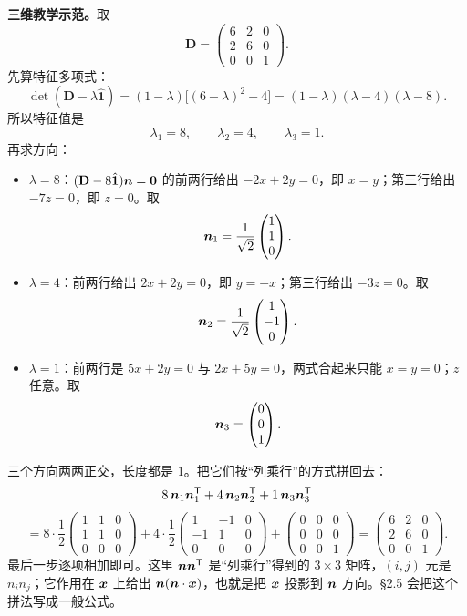 \documentclass[11pt]{ctexart}
\newcommand{\ten}[1]{\mathbf{#1}}
\newcommand{\unitd}{\hat{\ten{1}}}
\begin{document}
\textbf{三维教学示范。}取
\[
\ten D=\begin{pmatrix}6&2&0\\2&6&0\\0&0&1\end{pmatrix}.
\]
先算特征多项式：
\[
\det(\ten D-\lambda\unitd)
=(1-\lambda)\bigl[(6-\lambda)^2-4\bigr]
=(1-\lambda)(\lambda-4)(\lambda-8).
\]
所以特征值是
\[
\lambda_1=8,\qquad \lambda_2=4,\qquad \lambda_3=1.
\]
再求方向：
\begin{itemize}[leftmargin=1.8em,itemsep=2pt]
\item $\lambda=8$：$(\ten D-8\unitd)\vect n=\vect0$ 的前两行给出 $-2x+2y=0$，即 $x=y$；第三行给出 $-7z=0$，即 $z=0$。取
\[
\boldsymbol{n}_1=\frac{1}{\sqrt2}\begin{pmatrix}1\\1\\0\end{pmatrix}.
\]
\item $\lambda=4$：前两行给出 $2x+2y=0$，即 $y=-x$；第三行给出 $-3z=0$。取
\[
\boldsymbol{n}_2=\frac{1}{\sqrt2}\begin{pmatrix}1\\-1\\0\end{pmatrix}.
\]
\item $\lambda=1$：前两行是 $5x+2y=0$ 与 $2x+5y=0$，两式合起来只能 $x=y=0$；$z$ 任意。取
\[
\boldsymbol{n}_3=\begin{pmatrix}0\\0\\1\end{pmatrix}.
\]
\end{itemize}
三个方向两两正交，长度都是 $1$。把它们按“列乘行”的方式拼回去：
\[
8\,\boldsymbol{n}_1\boldsymbol{n}_1^{\mathsf T}
+4\,\boldsymbol{n}_2\boldsymbol{n}_2^{\mathsf T}
+1\,\boldsymbol{n}_3\boldsymbol{n}_3^{\mathsf T}
\]
\[
=8\cdot\frac12\begin{pmatrix}1&1&0\\1&1&0\\0&0&0\end{pmatrix}
+4\cdot\frac12\begin{pmatrix}1&-1&0\\-1&1&0\\0&0&0\end{pmatrix}
+\begin{pmatrix}0&0&0\\0&0&0\\0&0&1\end{pmatrix}
=\begin{pmatrix}6&2&0\\2&6&0\\0&0&1\end{pmatrix}.
\]
最后一步逐项相加即可。这里 $\boldsymbol{n}\boldsymbol{n}^{\mathsf T}$ 是“列乘行”得到的 $3\times3$ 矩阵，$(i,j)$ 元是 $n_in_j$；它作用在 $\boldsymbol{x}$ 上给出 $\boldsymbol{n}(\boldsymbol{n}\cdot\boldsymbol{x})$，也就是把 $\boldsymbol{x}$ 投影到 $\boldsymbol{n}$ 方向。\S2.5 会把这个拼法写成一般公式。
\end{document}
